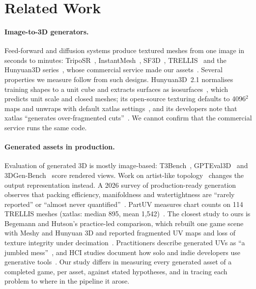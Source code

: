 \section{Related Work}

\paragraph{Image-to-3D generators.} Feed-forward and diffusion systems produce
textured meshes from one image in seconds to minutes:
TripoSR~\cite{tochilkin2024triposr}, InstantMesh~\cite{xu2024instantmesh},
SF3D~\cite{boss2025sf3d}, TRELLIS~\cite{xiang2025trellis} and the Hunyuan3D
series~\cite{zhao2025hunyuan3d20,hunyuan2025hunyuan3d21}, whose commercial
service made our assets~\cite{tencent2026hunyuan3dapi}. Several properties we
measure follow from such designs. Hunyuan3D~2.1 normalises training shapes to a
unit cube and extracts surfaces as isosurfaces~\cite{hunyuan2025hunyuan3d21},
which predicts unit scale and closed meshes; its open-source texturing defaults to
4096$^2$ maps and unwraps with default xatlas settings~\cite{hunyuan21code}, and
its developers note that xatlas ``generates over-fragmented
cuts''~\cite{lei2025hunyuan3dstudio}. We cannot confirm that the commercial
service runs the same code.

\paragraph{Generated assets in production.} Evaluation of generated 3D is mostly
image-based: T3Bench~\cite{he2023t3bench}, GPTEval3D~\cite{wu2024gpteval3d} and
3DGen-Bench~\cite{zhang2025threedgenbench} score rendered views. Work on
artist-like topology~\cite{siddiqui2024meshgpt,chen2025meshanything} changes the
output representation instead. A 2026 survey of production-ready generation
observes that packing efficiency, manifoldness and watertightness are ``rarely
reported'' or ``almost never quantified''~\cite{wu2026productionready}. PartUV
measures chart counts on 114 TRELLIS meshes (xatlas: median 895, mean
1,542)~\cite{wang2025partuv}. The closest study to ours is Begemann and Hutson's
practice-led comparison, which rebuilt one game scene with Meshy and Hunyuan 3D
and reported fragmented UV maps and loss of texture integrity under
decimation~\cite{begemann2026prompted}. Practitioners describe generated UVs as
``a jumbled mess''~\cite{edwards2024spot}, and HCI studies document how solo and
indie developers use generative tools~\cite{panchanadikar2024solo}. Our study
differs in measuring every generated asset of a completed game, per asset,
against stated hypotheses, and in tracing each problem to where in the pipeline
it arose.

